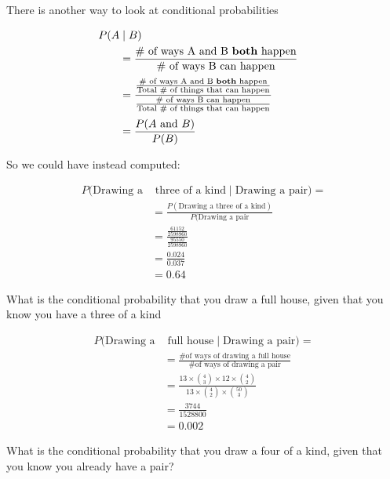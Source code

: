 %
\begin{frame}

There is another way to look at conditional probabilities

\begin{align*}
P(A & \mid B) & \\
%
&= \frac{\text{\# of ways A and B \textbf{both} happen}}{\text{\#
of ways B can happen}} \\[0.5ex]
%
&= \frac{\frac{\text{\# of ways A and B \textbf{both} happen}}{\text{Total \# of
things that can happen}}}{\frac{\text{\# of ways B can happen}}{\text{Total \# of
things that can happen}}} \\[0.5ex]
%
&= \frac{P(A \text{ and } B)}{P(B)}
\end{align*}

\end{frame}
%

%
\begin{frame}

So we could have instead computed:

\begin{align*}
P(\text{Drawing a} & \text{ three of a kind} \mid \text{Drawing a pair}) = \\
%
&= \frac{P(\text{Drawing a three of a kind})}{P(\text{Drawing a pair}} \\
%
&= \frac{\frac{61152}{2598960}}{\frac{95550}{2598960}} \\
%
&= \frac{0.024}{0.037} \\
%
&= 0.64
\end{align*}

\end{frame}
%

%
\begin{frame}

What is the conditional probability that you draw a full house, given that you know you
have a three of a kind

\begin{align*}
P(\text{Drawing a} & \text{ full house} \mid \text{Drawing a pair}) = \\
%
&= \frac{\text{\# of ways of drawing a full house}}{\text{\# of ways of drawing
a pair}} \\
%
&= \frac{ 13 \times {{4}\choose{3}} \times 12 \times {{4}\choose{2}} } {13
\times {{4}\choose{2}} \times {{50}\choose{3}}} \\
%
%
&= \frac{3744}{1528800} \\
%
&= 0.002
\end{align*}

\end{frame}
%

%
\begin{frame}
What is the conditional probability that you draw a four of a kind, given that
you know you already have a pair?
\end{frame}
